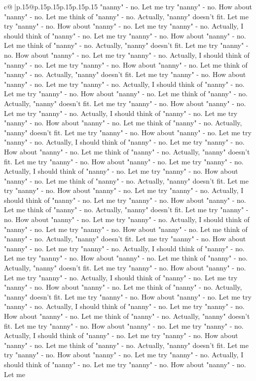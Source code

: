\documentclass{article}
\begin{document}
{\begin{supertabular}{c@{$\;$}|p{.15\linewidth}@{}p{.15\linewidth}p{.15\linewidth}p{.15\linewidth}p{.15\linewidth}p{.15\linewidth}}
{{{"nanny" {-} no. Let me try "nanny" {-} no. How about "nanny" {-} no. Let me think of "nanny" {-} no. Actually, "nanny" doesn't fit. Let me try "nanny" {-} no. How about "nanny" {-} no. Let me try "nanny" {-} no. Actually, I should think of "nanny" {-} no. Let me try "nanny" {-} no. How about "nanny" {-} no. Let me think of "nanny" {-} no. Actually, "nanny" doesn't fit. Let me try "nanny" {-} no. How about "nanny" {-} no. Let me try "nanny" {-} no. Actually, I should think of "nanny" {-} no. Let me try "nanny" {-} no. How about "nanny" {-} no. Let me think of "nanny" {-} no. Actually, "nanny" doesn't fit. Let me try "nanny" {-} no. How about "nanny" {-} no. Let me try "nanny" {-} no. Actually, I should think of "nanny" {-} no. Let me try "nanny" {-} no. How about "nanny" {-} no. Let me think of "nanny" {-} no. Actually, "nanny" doesn't fit. Let me try "nanny" {-} no. How about "nanny" {-} no. Let me try "nanny" {-} no. Actually, I should think of "nanny" {-} no. Let me try "nanny" {-} no. How about "nanny" {-} no. Let me think of "nanny" {-} no. Actually, "nanny" doesn't fit. Let me try "nanny" {-} no. How about "nanny" {-} no. Let me try "nanny" {-} no. Actually, I should think of "nanny" {-} no. Let me try "nanny" {-} no. How about "nanny" {-} no. Let me think of "nanny" {-} no. Actually, "nanny" doesn't fit. Let me try "nanny" {-} no. How about "nanny" {-} no. Let me try "nanny" {-} no. Actually, I should think of "nanny" {-} no. Let me try "nanny" {-} no. How about "nanny" {-} no. Let me think of "nanny" {-} no. Actually, "nanny" doesn't fit. Let me try "nanny" {-} no. How about "nanny" {-} no. Let me try "nanny" {-} no. Actually, I should think of "nanny" {-} no. Let me try "nanny" {-} no. How about "nanny" {-} no. Let me think of "nanny" {-} no. Actually, "nanny" doesn't fit. Let me try "nanny" {-} no. How about "nanny" {-} no. Let me try "nanny" {-} no. Actually, I should think of "nanny" {-} no. Let me try "nanny" {-} no. How about "nanny" {-} no. Let me think of "nanny" {-} no. Actually, "nanny" doesn't fit. Let me try "nanny" {-} no. How about "nanny" {-} no. Let me try "nanny" {-} no. Actually, I should think of "nanny" {-} no. Let me try "nanny" {-} no. How about "nanny" {-} no. Let me think of "nanny" {-} no. Actually, "nanny" doesn't fit. Let me try "nanny" {-} no. How about "nanny" {-} no. Let me try "nanny" {-} no. Actually, I should think of "nanny" {-} no. Let me try "nanny" {-} no. How about "nanny" {-} no. Let me think of "nanny" {-} no. Actually, "nanny" doesn't fit. Let me try "nanny" {-} no. How about "nanny" {-} no. Let me try "nanny" {-} no. Actually, I should think of "nanny" {-} no. Let me try "nanny" {-} no. How about "nanny" {-} no. Let me think of "nanny" {-} no. Actually, "nanny" doesn't fit. Let me try "nanny" {-} no. How about "nanny" {-} no. Let me try "nanny" {-} no. Actually, I should think of "nanny" {-} no. Let me try "nanny" {-} no. How about "nanny" {-} no. Let me think of "nanny" {-} no. Actually, "nanny" doesn't fit. Let me try "nanny" {-} no. How about "nanny" {-} no. Let me try "nanny" {-} no. Actually, I should think of "nanny" {-} no. Let me try "nanny" {-} no. How about "nanny" {-} no. Let me }}}
\end{supertabular}}
\end{document}
